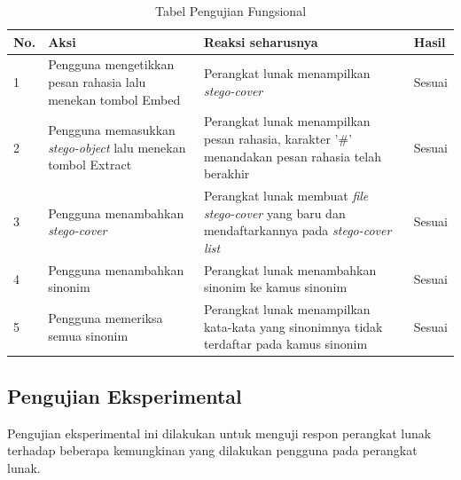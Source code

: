 \begin{table}[H]
\label{table-fungsional}
\centering
\caption{Tabel Pengujian Fungsional}
\begin{tabular}{|p{0.3cm} | p{4.5cm} | p{7cm} | p{1.5cm} |}\hline
No. & Aksi & Reaksi seharusnya & Hasil\\
\hline
1 & Pengguna mengetikkan pesan rahasia lalu menekan tombol Embed & Perangkat lunak menampilkan \textit{stego-cover} & Sesuai\\
2 & Pengguna memasukkan \textit{stego-object} lalu menekan tombol Extract & Perangkat lunak menampilkan pesan rahasia, karakter '\#' menandakan pesan rahasia telah berakhir & Sesuai\\
3 & Pengguna menambahkan \textit{stego-cover} & Perangkat lunak membuat \textit{file stego-cover} yang baru dan mendaftarkannya pada \textit{stego-cover list} & Sesuai\\
4 & Pengguna menambahkan sinonim & Perangkat lunak menambahkan sinonim ke kamus sinonim & Sesuai\\
5 & Pengguna memeriksa semua sinonim & Perangkat lunak menampilkan kata-kata yang sinonimnya tidak terdaftar pada kamus sinonim & Sesuai\\
\hline
\end{tabular}
\end{table}

\subsection{Pengujian Eksperimental}
Pengujian eksperimental ini dilakukan untuk menguji respon perangkat lunak terhadap beberapa kemungkinan yang dilakukan pengguna pada perangkat lunak.

